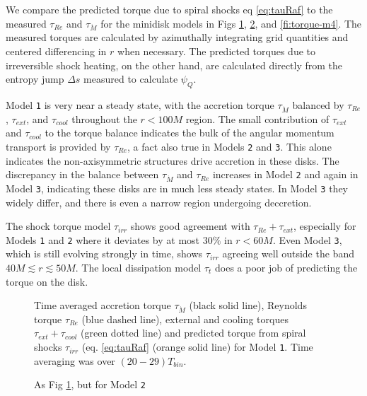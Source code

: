 \documentclass{emulateapj}
\newcommand{\De}{\Delta}
\newcommand{\model}[1]{{Model \texttt{#1}}}
\begin{document}
We compare the predicted torque due to spiral shocks eq \eqref{eq:tauRaf} to the measured $\tau_{Re}$ and $\tau_{\dot{M}}$ for the minidisk models in Figs \ref{fi:torque-m2}, \ref{fi:torque-m3}, and \ref{fi:torque-m4}.  The measured torques are calculated by azimuthally integrating grid quantities and centered differencing in $r$ when necessary.  The predicted torques due to irreversible shock heating, on the other hand, are calculated directly from the entropy jump $\De s$ measured to calculate $\psi_Q$.  

\model{1} is very near a steady state, with the accretion torque $\tau_{\dot{M}}$ balanced by $\tau_{Re}$, $\tau_{ext}$, and $\tau_{cool}$ throughout the $r < 100M$ region.  The small contribution of $\tau_{ext}$ and $\tau_{cool}$ to the torque balance indicates the bulk of the angular momentum transport is provided by $\tau_{Re}$, a fact also true in Models \texttt{2} and \texttt{3}.  This alone indicates the non-axisymmetric structures drive accretion in these disks.  The discrepancy in the balance between $\tau_{\dot{M}}$ and $\tau_{Re}$ increases in \model{2} and again in \model{3}, indicating these disks are in much less steady states.  In \model{3} they widely differ, and there is even a narrow region undergoing deccretion.  

The shock torque model $\tau_{irr}$ shows good agreement with $\tau_{Re}+\tau_{ext}$, especially for Models \texttt{1} and \texttt{2} where it deviates by at most $30\%$ in $r < 60M$.  Even \model{3}, which is still evolving strongly in time, shows $\tau_{irr}$ agreeing well outside the band $40M \lesssim r \lesssim 50M$.  The local dissipation model $\tau_t$ does a poor job of predicting the torque on the disk.

\begin{figure}
	\caption{\label{fi:torque-m2} Time averaged accretion torque $\tau_{\dot{M}}$ (black solid line), Reynolds torque $\tau_{Re}$ (blue dashed line), external and cooling torques $\tau_{ext}+\tau_{cool}$ (green dotted line) and predicted torque from spiral shocks $\tau_{irr}$ (eq. \eqref{eq:tauRaf} (orange solid line) for \model{1}. Time averaging was over $(20-29)T_{bin}$.}  
\end{figure}

\begin{figure}
	\caption{\label{fi:torque-m3} As Fig \ref{fi:torque-m2}, but for \model{2}}  
\end{figure}
\end{document}
